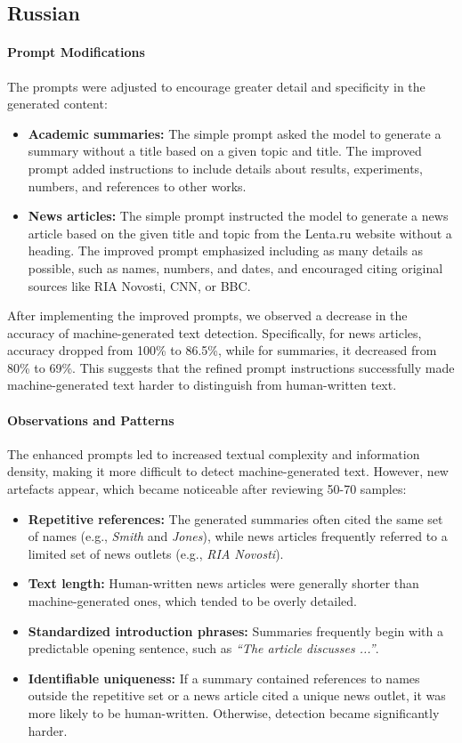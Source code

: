 \subsection{Russian}

\paragraph{Prompt Modifications}
The prompts were adjusted to encourage greater detail and specificity in the generated content:
\begin{itemize}
\item \textbf{Academic summaries:} The simple prompt asked the model to generate a summary without a title based on a given topic and title. The improved prompt added instructions to include details about results, experiments, numbers, and references to other works.
\item \textbf{News articles:} The simple prompt instructed the model to generate a news article based on the given title and topic from the Lenta.ru website without a heading. The improved prompt emphasized including as many details as possible, such as names, numbers, and dates, and encouraged citing original sources like RIA Novosti, CNN, or BBC.
\end{itemize}
After implementing the improved prompts, we observed a decrease in the accuracy of machine-generated text detection. Specifically, for news articles, accuracy dropped from 100\% to 86.5\%, while for summaries, it decreased from 80\% to 69\%. This suggests that the refined prompt instructions successfully made machine-generated text harder to distinguish from human-written text.

\paragraph{Observations and Patterns}
The enhanced prompts led to increased textual complexity and information density, making it more difficult to detect machine-generated text. However, new artefacts appear, which became noticeable after reviewing 50-70 samples:
\begin{itemize}
\item \textbf{Repetitive references:} The generated summaries often cited the same set of names (e.g., \textit{Smith} and \textit{Jones}), while news articles frequently referred to a limited set of news outlets (e.g., \textit{RIA Novosti}).
\item \textbf{Text length:} Human-written news articles were generally shorter than machine-generated ones, which tended to be overly detailed.
\item \textbf{Standardized introduction phrases:} Summaries frequently begin with a predictable opening sentence, such as \textit{``The article discusses ...''}.
\item \textbf{Identifiable uniqueness:} If a summary contained references to names outside the repetitive set or a news article cited a unique news outlet, it was more likely to be human-written. Otherwise, detection became significantly harder.
\end{itemize}

